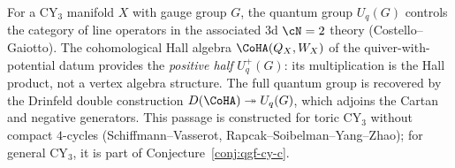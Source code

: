 \begin{remark}
\label{rem:qgf-coha-line-ops}
For a CY$_3$ manifold $X$ with gauge group $G$, the quantum group $U_q(G)$ controls the category of line operators in the associated 3d $\cN = 2$ theory (Costello--Gaiotto). The cohomological Hall algebra $\CoHA(Q_X, W_X)$ of the quiver-with-potential datum provides the \emph{positive half} $U_q^+(G)$: its multiplication is the Hall product, not a vertex algebra structure. The full quantum group is recovered by the Drinfeld double construction $D(\CoHA) \twoheadrightarrow U_q(G)$, which adjoins the Cartan and negative generators. This passage is constructed for toric CY$_3$ without compact $4$-cycles (Schiffmann--Vasserot, Rapcak--Soibelman--Yang--Zhao); for general CY$_3$, it is part of Conjecture~\ref{conj:qgf-cy-c}.
\end{remark}

